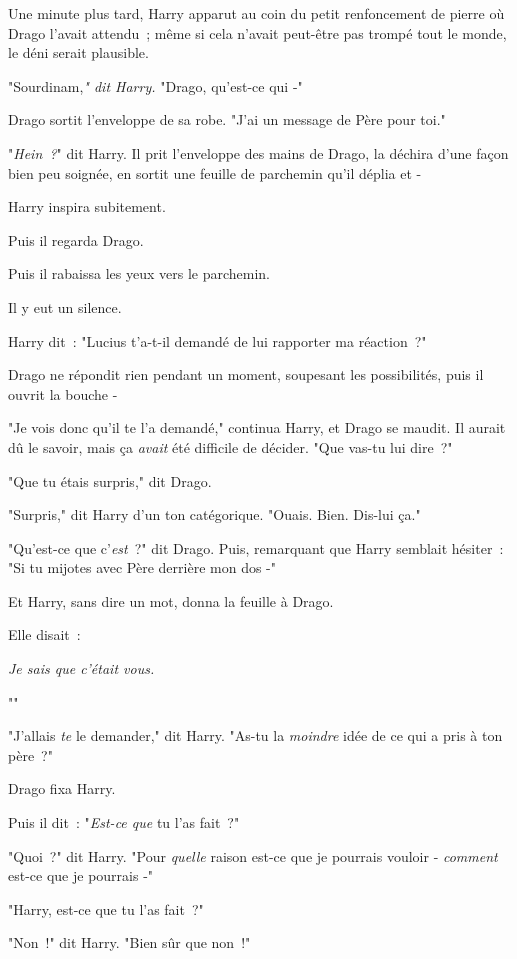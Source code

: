 Une minute plus tard, Harry apparut au coin du petit renfoncement de pierre où Drago l'avait attendu~; même si cela n'avait peut-être pas trompé tout le monde, le déni serait plausible.

"Sourdinam,\emph{" dit Harry.} "Drago, qu'est-ce qui -"

Drago sortit l'enveloppe de sa robe. "J'ai un message de Père pour toi."

"\emph{Hein~?}" dit Harry. Il prit l'enveloppe des mains de Drago, la déchira d'une façon bien peu soignée, en sortit une feuille de parchemin qu'il déplia et -

Harry inspira subitement.

Puis il regarda Drago.

Puis il rabaissa les yeux vers le parchemin.

Il y eut un silence.

Harry dit~: "Lucius t'a-t-il demandé de lui rapporter ma réaction~?"

Drago ne répondit rien pendant un moment, soupesant les possibilités, puis il ouvrit la bouche -

"Je vois donc qu'il te l'a demandé," continua Harry, et Drago se maudit. Il aurait dû le savoir, mais ça \emph{avait} été difficile de décider. "Que vas-tu lui dire~?"

"Que tu étais surpris," dit Drago.

"Surpris," dit Harry d'un ton catégorique. "Ouais. Bien. Dis-lui ça."

"Qu'est-ce que c'\emph{est}~?" dit Drago. Puis, remarquant que Harry semblait hésiter~: "Si tu mijotes avec Père derrière mon dos -"

Et Harry, sans dire un mot, donna la feuille à Drago.

Elle disait~:

\emph{Je sais que c'était vous.}

"\emph{}"

"J'allais \emph{te} le demander," dit Harry. "As-tu la \emph{moindre} idée de ce qui a pris à ton père~?"

Drago fixa Harry.

Puis il dit~: "\emph{Est-ce que} tu l'as fait~?"

"Quoi~?" dit Harry. "Pour \emph{quelle} raison est-ce que je pourrais vouloir - \emph{comment} est-ce que je pourrais -"

"Harry, est-ce que tu l'as fait~?"

"Non~!" dit Harry. "Bien sûr que non~!"

